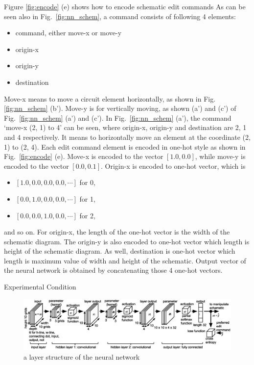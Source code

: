 \documentclass[twocolumn]{article}
\makeatletter
\def\section{\@startsection {section}{1}{\z@}{20pt plus 2pt minus 2pt}
{8pt plus 2pt minus 2pt}{\centering\normalsize\sc
\edef\@svsec{\thesection.\ }}}
\def\thesection{\Roman{section}}
\makeatother
\begin{document}
Figure \ref{fig:encode} (e) shows how to encode schematic edit commands
As can be seen also in Fig.\ \ref{fig:nn_schem},
a command consists of following 4 elements:
\begin{itemize}
\item command, either move-x or move-y
\item origin-x
\item origin-y
\item destination
\end{itemize}
Move-x means to move a circuit element horizontally,
as shown in Fig. \ref{fig:nn_schem} (b').
Move-y is for vertically moving, as shown (a') and (c')
of Fig.\ \ref{fig:nn_schem} (a') and (c').
In Fig.\ \ref{fig:nn_schem} (a'), 
the command `move-x (2, 1) to 4' can be seen,
where origin-x, origin-y and destination are 2, 1 and 4 respectively.
It means to horizontally move an element at the coordinate (2, 1) to (2, 4).
Each edit command element is encoded in one-hot style
as shown in Fig.\ \ref{fig:encode} (e).
Move-x is encoded to the vector $[1.0, 0.0]$, 
while move-y is encoded to the vector $[0.0, 0.1]$. 
Origin-x is encoded to one-hot vector, which is
\begin{itemize}
\item $[1.0, 0.0, 0.0, 0.0, \cdots]$ for 0,
\item $[0.0, 1.0, 0.0, 0.0, \cdots]$ for 1, 
\item $[0.0, 0.0, 1.0, 0.0, \cdots]$ for 2,
\end{itemize}
and so on.
For origin-x, the length of the one-hot vector is the width of
the schematic diagram.
The origin-y is also encoded to one-hot vector which length is
height of the schematic diagram.
As well, destination is one-hot vector which length is
maximum value of width and height of the schematic.
Output vector of the neural network is obtained
by concatenating those 4 one-hot vectors.

\section{Experimental Condition}

\begin{figure}[!tp]
 \begin{center}
  \begin{minipage}{\hsize}
   \includegraphics[width=\hsize]{fig/layers_06.eps}
   \caption{a layer structure of the neural network}
   \label{fig:layers}
  \end{minipage}
 \end{center}
\end{figure}
\end{document}
